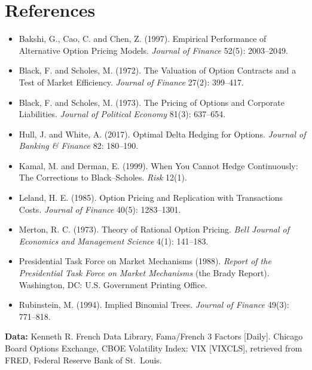 \section*{References}

\begin{itemize}
  \item Bakshi, G., Cao, C. and Chen, Z. (1997). Empirical Performance of Alternative Option Pricing Models. \emph{Journal of Finance} 52(5): 2003--2049.
  \item Black, F. and Scholes, M. (1972). The Valuation of Option Contracts and a Test of Market Efficiency. \emph{Journal of Finance} 27(2): 399--417.
  \item Black, F. and Scholes, M. (1973). The Pricing of Options and Corporate Liabilities. \emph{Journal of Political Economy} 81(3): 637--654.
  \item Hull, J. and White, A. (2017). Optimal Delta Hedging for Options. \emph{Journal of Banking \& Finance} 82: 180--190.
  \item Kamal, M. and Derman, E. (1999). When You Cannot Hedge Continuously: The Corrections to Black--Scholes. \emph{Risk} 12(1).
  \item Leland, H. E. (1985). Option Pricing and Replication with Transactions Costs. \emph{Journal of Finance} 40(5): 1283--1301.
  \item Merton, R. C. (1973). Theory of Rational Option Pricing. \emph{Bell Journal of Economics and Management Science} 4(1): 141--183.
  \item Presidential Task Force on Market Mechanisms (1988). \emph{Report of the Presidential Task Force on Market Mechanisms} (the Brady Report). Washington, DC: U.S. Government Printing Office.
  \item Rubinstein, M. (1994). Implied Binomial Trees. \emph{Journal of Finance} 49(3): 771--818.
\end{itemize}

\textbf{Data:} Kenneth R. French Data Library, Fama/French 3 Factors [Daily]. Chicago Board Options Exchange, CBOE Volatility Index: VIX [VIXCLS], retrieved from FRED, Federal Reserve Bank of St.\ Louis.
